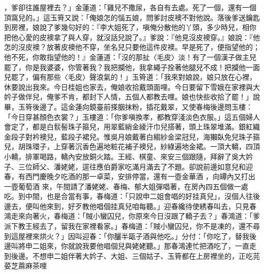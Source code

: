 \begin{showcontents}{}
，爹卻往誰屋裡去？」金蓮道：「雞兒不撒尿，各自有去處。死了一個，還有一個頂窩兒的。」這玉筲又說：「俺娘怎的惱五娘，問爹討皮襖不對他說。落後爹送鑰匙到房裡，娘說了爹幾句好的：『李大姐死了，嗔俺分散他的丫頭，多少時兒，相你把他心愛的皮襖拿了與人穿，就沒話兒說了。』爹說：『他見沒皮襖穿。』娘說：『他怎的沒皮襖？放著皮襖他不穿，坐名兒只要他這件皮襖。早是死了，便指望他的；他不死，你敢指望他的！』金蓮道：「沒的那扯〈毛皮〉淡！有了一個漢子做主兒罷了，你是我婆婆，你管著我？我把攔他，我拿繩子拴著他腿兒不成！把攔他一面兒罷了，偏有那些〈毛皮〉聲浪氣的！」玉筲道：「我來對娘說，娘只放在心裡，休要說出我來。今日桂姐也家去，俺娘收拾戴頭面哩。今日要留下雪娥在家裡與大妗子做伴兒，俺爹不肯，都封下人情，五個人都教去哩。娘也快些收拾了罷！」說畢，玉筲後邊了。這金蓮向鏡臺前搽胭抹粉，插花戴翠，又使春梅後邊問玉樓：「今日穿甚顏色衣裳？」玉樓道：「你爹嗔換孝，都教穿淺淡色衣服。」這五個婦人會定了，都是白䯼髻珠子箍兒，用翠藍綃金綾汗巾兒搭著，頭上珠翠堆滿。銀紅織金段子對衿襖兒，藍段子裙兒。惟吳月娘戴著白縐紗金梁冠兒，海獺臥免兒珠子箍兒，胡珠環子，上穿著沉香色遍地粧花補子襖兒，紗綠遍地金裙。一頂大轎，四頂小轎，排軍喝路，轎內安放銅火踏。王經、棋童、來安三個跟隨，拜辭了吳大妗子、三位師父、潘姥姥，逕往應伯爵家吃滿月滿去了不題。卻說前邊如意兒和迎春，有西門慶晚夕吃酒的那一卓菜，安排停當，還有一壺金華酒 ，向罈內又打出一壺葡萄酒 來，午間請了潘姥姥、春梅、郁大姐彈唱著，在房內四五個做一處吃。到中間，也是合當有事，春梅道：「只說申二姐會唱的好挂真兒」，沒個人往後邊去，便叫他來到，好歹教他唱個挂真兒咱每聽。」迎春纔待使綉春叫去，只見春鴻走來向著火，春梅道：「賊小蠻囚兒，你原來今日沒跟了轎子去？」春鴻道：「爹派下教王經去了，留我在家裡看家。」春梅道：「賊小蠻囚兒，你不是凍的，還不尋到這屋裡來烘火？」因叫迎春：「你釃半甌子酒與他吃。」分付：「你吃了，替我後邊叫將申二姐來，你就說我要他唱個兒與姥姥聽。」那春鴻連忙把酒吃了，一直走到後邊。不想申二姐伴著大妗子、大姐、三個姑子、玉筲都在上房裡坐的，正吃芫荽芝蔴麻茶哩 
\end{showcontents}
